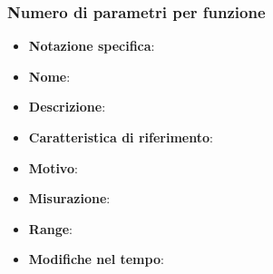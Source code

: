 \subsubsection{Numero di parametri per funzione}
\begin{itemize}
    \item \textbf{Notazione specifica}:
    \item \textbf{Nome}:
    \item \textbf{Descrizione}:
    \item \textbf{Caratteristica di riferimento}: 
    \item \textbf{Motivo}: 
    \item \textbf{Misurazione}: 
    \item \textbf{Range}: 
    \item \textbf{Modifiche nel tempo}:  
\end{itemize}